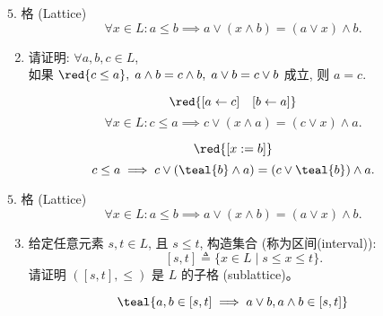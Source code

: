 \begin{frame}{}
  \begin{exampleblock}{$5.$ 格 (Lattice)}
    \[
      \forall x \in L: a \le b \implies a \lor (x \land b) = (a \lor x) \land b.
    \]

    \begin{enumerate}[(1)]
      \setcounter{enumi}{1}
    \item 请证明: $\forall a, b, c \in L$, \\
      如果 $\red{c \le a}, \; a \land b = c \land b, \; a \lor b = c \lor b$ 成立, 则 $a = c$.
    \end{enumerate}
  \end{exampleblock}

  \pause
  \[
    \red{[a \leftarrow c] \quad [b \leftarrow a]}
  \]
  \[
    \forall x \in L: c \le a \implies c \lor (x \land a) = (c \lor x) \land a.
  \]

  \pause
  \[
    \red{[x := b]}
  \]
  \[
    c \le a \implies c \lor (\teal{b} \land a) = (c \lor \teal{b}) \land a.
  \]
\end{frame}

\begin{frame}{}
  \begin{exampleblock}{$5.$ 格 (Lattice)}
    \[
      \forall x \in L: a \le b \implies a \lor (x \land b) = (a \lor x) \land b.
    \]

    \begin{enumerate}[(1)]
      \setcounter{enumi}{2}
      \item 给定任意元素 $s, t \in L$, 且 $s \le t$, 构造集合 (称为区间(interval)):
	\[
	  [s, t] \triangleq \{x \in L \mid s \le x \le t\}.
	\]
	请证明 $([s,t], \le)$ 是 $L$ 的子格 (sublattice)。
    \end{enumerate}
  \end{exampleblock}

  \pause

  \pause
  \vspace{-0.50cm}
  \[
    \teal{a,b \in [s,t] \implies a \lor b, a \land b \in [s,t]}
  \]
\end{frame}

